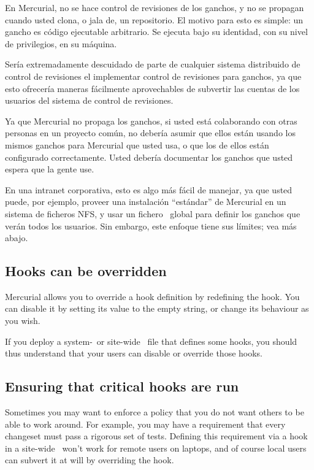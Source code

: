 En Mercurial, no se hace control de revisiones de los ganchos, y no se
propagan cuando usted clona, o jala de, un repositorio. El motivo para
esto es simple: un gancho es código ejecutable arbitrario. Se ejecuta
bajo su identidad, con su nivel de privilegios, en su máquina.

Sería extremadamente descuidado de parte de cualquier sistema
distribuido de control de revisiones el implementar control de
revisiones para ganchos, ya que esto ofrecería maneras fácilmente
aprovechables de subvertir las cuentas de los usuarios del sistema de
control de revisiones.

Ya que Mercurial no propaga los ganchos, si usted está colaborando con
otras personas en un proyecto común, no debería asumir que ellos están
usando los mismos ganchos para Mercurial que usted usa, o que los de
ellos están configurado correctamente. Usted debería documentar los
ganchos que usted espera que la gente use.

En una intranet corporativa, esto es algo más fácil de manejar, ya que
usted puede, por ejemplo, proveer una instalación ``estándar'' de
Mercurial en un sistema de ficheros NFS, y usar un fichero \hgrc\
global para definir los ganchos que verán todos los usuarios. Sin
embargo, este enfoque tiene sus límites; vea más abajo.

\subsection{Hooks can be overridden}

Mercurial allows you to override a hook definition by redefining the
hook.  You can disable it by setting its value to the empty string, or
change its behaviour as you wish.

If you deploy a system-~or site-wide \hgrc\ file that defines some
hooks, you should thus understand that your users can disable or
override those hooks.

\subsection{Ensuring that critical hooks are run}

Sometimes you may want to enforce a policy that you do not want others
to be able to work around.  For example, you may have a requirement
that every changeset must pass a rigorous set of tests.  Defining this
requirement via a hook in a site-wide \hgrc\ won't work for remote
users on laptops, and of course local users can subvert it at will by
overriding the hook.

